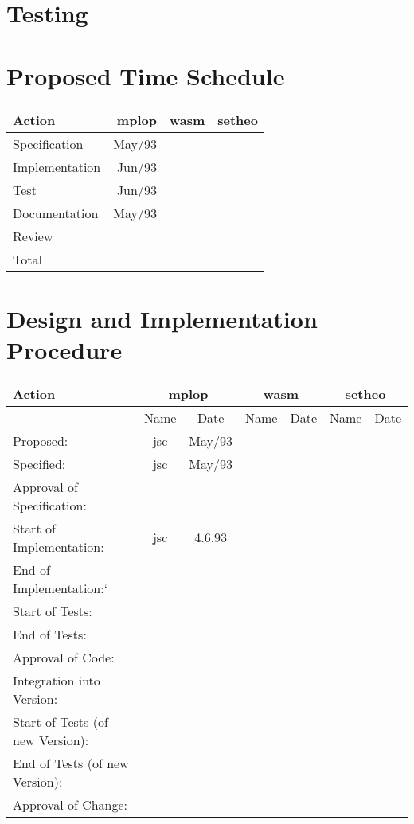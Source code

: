 \section{Testing}

\section{Proposed Time Schedule}

\begin{center}
\begin{tabular}{|l|r|r|r|}
\hline\hline
Action & mplop & wasm & setheo \\
\hline
Specification & May/93& & \\
Implementation &Jun/93 & & \\
Test &Jun/93 & & \\
Documentation &May/93 & & \\
Review & & & \\
\hline
Total & & & \\
\hline\hline
\end{tabular}
\end{center}


\section{Design and Implementation Procedure}

\begin{center}
\begin{tabular}{|l||c|c||c|c||c|c||}
\hline\hline
Action & \multicolumn{2}{|c|}{mplop} &
\multicolumn{2}{|c|}{wasm} & \multicolumn{2}{|c|}{setheo}  \\
\hline
& Name & Date & Name & Date & Name & Date \\
\hline\hline
 Proposed:& jsc & May/93 & & & & \\
 Specified:&jsc &May/93  & & & & \\
 Approval of Specification:& & & & & & \\
 Start of Implementation:& jsc& 4.6.93& & & & \\
 End of Implementation:`& & & & & & \\
 Start of Tests:& & & & & & \\
 End of Tests:& & & & & & \\
 Approval of Code:& & & & & & \\
 Integration into Version: & & & & & & \\
 Start of Tests (of new Version):& & & & & & \\
 End of Tests (of new Version):& & & & & & \\
 Approval of Change:& & & & & & \\
\hline\hline
\end{tabular}
\end{center}


